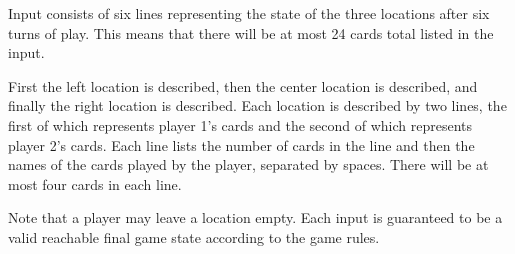 
Input consists of six lines representing the state of the three locations after six turns of play.
This means that there will be at most 24 cards total listed in the input.

First the left location is described, then the center location is described, and finally the right location is described.
Each location is described by two lines, the first of which represents player 1's cards and the second of which represents player 2's cards.
Each line lists the number of cards in the line and then the names of the cards played by the player, separated by spaces.
There will be at most four cards in each line.

Note that a player may leave a location empty.
Each input is guaranteed to be a valid reachable final game state according to the game rules.


